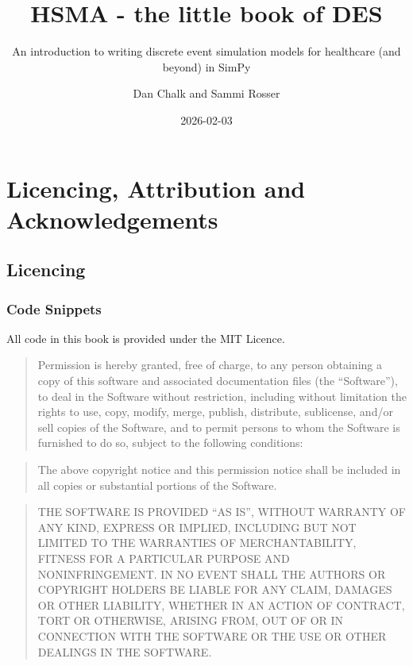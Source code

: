 \documentclass[
  letterpaper,
  DIV=11,
  numbers=noendperiod]{scrreprt}
\title{HSMA - the little book of DES}
\subtitle{An introduction to writing discrete event simulation models
for healthcare (and beyond) in SimPy}
\author{Dan Chalk and Sammi Rosser}
\date{2026-02-03}
\renewcommand*\contentsname{Table of contents}
\newcommand\contentsname{Table of contents}
\begin{document}
\maketitle

\renewcommand*\contentsname{Table of contents}
{
\hypersetup{linkcolor=}
\setcounter{tocdepth}{1}
\tableofcontents
}

\chapter*{Licencing, Attribution and
Acknowledgements}\label{licencing-attribution-and-acknowledgements}


\section*{Licencing}\label{licencing}


\subsection*{Code Snippets}\label{code-snippets}

All code in this book is provided under the MIT Licence.

\begin{quote}
Permission is hereby granted, free of charge, to any person obtaining a
copy of this software and associated documentation files (the
``Software''), to deal in the Software without restriction, including
without limitation the rights to use, copy, modify, merge, publish,
distribute, sublicense, and/or sell copies of the Software, and to
permit persons to whom the Software is furnished to do so, subject to
the following conditions:
\end{quote}

\begin{quote}
The above copyright notice and this permission notice shall be included
in all copies or substantial portions of the Software.
\end{quote}

\begin{quote}
THE SOFTWARE IS PROVIDED ``AS IS'', WITHOUT WARRANTY OF ANY KIND,
EXPRESS OR IMPLIED, INCLUDING BUT NOT LIMITED TO THE WARRANTIES OF
MERCHANTABILITY, FITNESS FOR A PARTICULAR PURPOSE AND NONINFRINGEMENT.
IN NO EVENT SHALL THE AUTHORS OR COPYRIGHT HOLDERS BE LIABLE FOR ANY
CLAIM, DAMAGES OR OTHER LIABILITY, WHETHER IN AN ACTION OF CONTRACT,
TORT OR OTHERWISE, ARISING FROM, OUT OF OR IN CONNECTION WITH THE
SOFTWARE OR THE USE OR OTHER DEALINGS IN THE SOFTWARE.
\end{quote}
\end{document}
